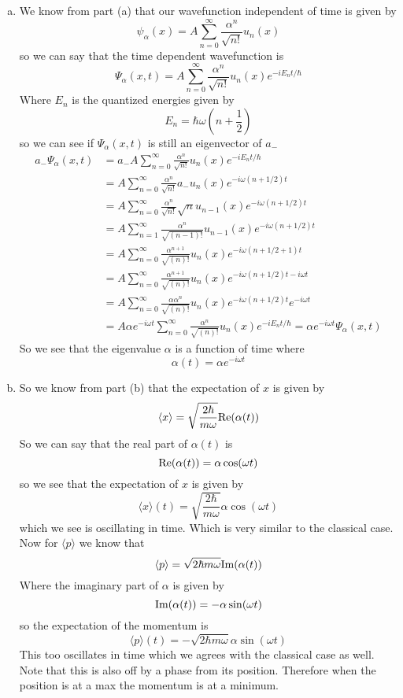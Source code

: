 \documentclass[11pt]{article}
\numberwithin{equation}{section}
\newcommand{\expt}[1]{\langle{#1}\rangle}
\begin{document}
\begin{enumerate}[(a)]
\item
We know from part (a) that our wavefunction independent of time is given by
$$\psi_{\alpha}(x) = A\sum_{n=0}^{\infty}\frac{\alpha^n}{\sqrt{n!}}u_n(x)$$
so we can say that the time dependent wavefunction is 
$$\Psi_{\alpha}(x,t) = A\sum_{n=0}^{\infty}\frac{\alpha^n}{\sqrt{n!}}u_n(x)e^{-iE_nt/\hbar}$$
Where $E_n$ is the quantized energies given by
$$E_n = \hbar\omega\left(n+\frac{1}{2}\right)$$
so we can see if $\Psi_{\alpha}(x,t)$ is still an eigenvector of $a_-$
\begin{align*}
a_-\Psi_{\alpha}(x,t) &= a_-A\sum_{n=0}^{\infty}\frac{\alpha^n}{\sqrt{n!}}u_n(x)e^{-iE_nt/\hbar}\\ 
&= A\sum_{n=0}^{\infty}\frac{\alpha^n}{\sqrt{n!}}a_-u_n(x)e^{-i\omega(n+1/2)t}\\ 
&= A\sum_{n=0}^{\infty}\frac{\alpha^n}{\sqrt{n!}}\sqrt{n}u_{n-1}(x)e^{-i\omega(n+1/2)t}\\ 
&= A\sum_{n=1}^{\infty}\frac{\alpha^n}{\sqrt{(n-1)!}}u_{n-1}(x)e^{-i\omega(n+1/2)t}\\ 
&= A\sum_{n=0}^{\infty}\frac{\alpha^{n+1}}{\sqrt{(n)!}}u_{n}(x)e^{-i\omega(n+1/2+1)t}\\ 
&= A\sum_{n=0}^{\infty}\frac{\alpha^{n+1}}{\sqrt{(n)!}}u_{n}(x)e^{-i\omega(n+1/2)t-i\omega t}\\ 
&= A\sum_{n=0}^{\infty}\frac{\alpha\alpha^{n}}{\sqrt{(n)!}}u_{n}(x)e^{-i\omega(n+1/2)t}e^{-i\omega t}\\ 
&= A\alpha e^{-i\omega t}\sum_{n=0}^{\infty}\frac{\alpha^{n}}{\sqrt{(n)!}}u_{n}(x)e^{-iE_nt/\hbar} = \alpha e^{-i\omega t}\Psi_{\alpha}(x,t)
\end{align*}
So we see that the eigenvalue $\alpha$ is a function of time where
$$\alpha(t) = \alpha e^{-i\omega t}$$

\item
So we know from part (b) that the expectation of $x$ is given by
$$\expt{x} = \sqrt{\frac{2\hbar}{m\omega}}\textnormal{Re}(\alpha(t))$$
So we can say that the real part of $\alpha(t)$ is
$$\textnormal{Re}(\alpha(t)) = \alpha\cos(\omega t)$$
so we see that the expectation of $x$ is given by
$$\expt{x}(t) = \sqrt{\frac{2\hbar}{m\omega}}\alpha\cos(\omega t)$$
which we see is oscillating in time. Which is very similar to the classical case. Now for $\expt{p}$ we know that
$$\expt{p} = \sqrt{2\hbar m\omega}\textnormal{Im}(\alpha(t))$$
Where the imaginary part of $\alpha$ is given by
$$\textnormal{Im}(\alpha(t)) = -\alpha\sin(\omega t)$$
so the expectation of the momentum is 
$$\expt{p}(t) = -\sqrt{2\hbar m\omega}\alpha\sin(\omega t)$$
This too oscillates in time which we agrees with the classical case as well. Note that this is also off by a phase from its position. Therefore when the position is at a max the momentum is at a minimum.
\end{enumerate}
\end{document}
